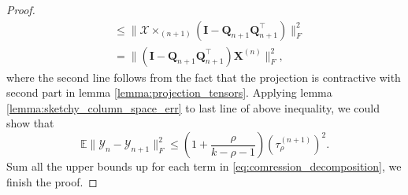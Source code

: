 \begin{lem}
\begin{proof}
\begin{equation}
\begin{aligned}
&\le \|\mathscr{X}\times_{(n+1)} (\mathbf{I} - \mathbf{Q}_{n+1}\mathbf{Q}_{n+1}^\top)\|_F^2 \\
&= \| (\mathbf{I} - \mathbf{Q}_{n+1}\mathbf{Q}_{n+1}^\top)\mathbf{X}^{(n)}\|_F^2,
\end{aligned}
\end{equation}
where the second line follows from the fact that the projection is contractive with second part in lemma \ref{lemma:projection_tensors}. 
Applying lemma \ref{lemma:sketchy_column_space_err} to last line of above inequality, we could show that 
\begin{equation}
\mathbb{E} \|\mathscr{Y}_n - \mathscr{Y}_{n+1}\|_F^2 \le \left(1+\frac{\rho}{k-\rho-1}\right)(\tau^{(n+1)}_\rho)^2.
\end{equation}
Sum all the upper bounds up for each term in  \eqref{eq:comression_decomposition}, we finish the proof. 
\end{proof}
\end{lem}
